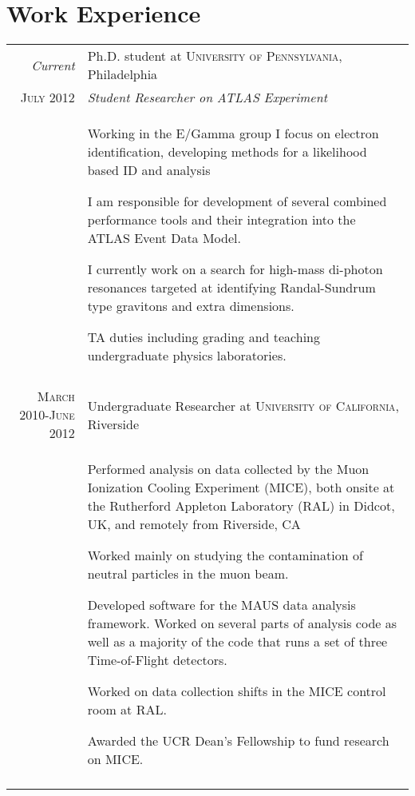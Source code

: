 \documentclass[a4paper,10pt]{article} %
\begin{document}

\section{Work Experience}

\begin{tabular}{r|p{11cm}}
\emph{Current}    & Ph.D. student at \textsc{University of Pennsylvania}, Philadelphia \\
\textsc{July 2012} & \emph{Student Researcher on ATLAS Experiment}\\
				   & \begin{itemize}
					 \footnotesize{
						\item Working in the E/Gamma group I focus on electron identification, developing methods for a likelihood based ID and analysis
						\item I am responsible for development of several combined performance tools and their integration into the ATLAS Event Data Model.
						\item I currently work on a search for high-mass di-photon resonances targeted at identifying Randal-Sundrum type gravitons and extra dimensions.
						\item TA duties including grading and teaching undergraduate physics laboratories.
					 }
					 \end{itemize} \\
\multicolumn{2}{c}{} \\


\textsc{March 2010-June 2012} & Undergraduate Researcher at \textsc{University of California}, Riverside \emph{}\\
				  & \begin{itemize}
					\footnotesize{
						\item Performed analysis on data collected by the Muon Ionization Cooling Experiment (MICE), both onsite at the Rutherford Appleton Laboratory (RAL) in Didcot, UK, and remotely from Riverside, CA
						\item Worked mainly on studying the contamination of neutral particles in the muon beam.
					    \item Developed software for the MAUS data analysis framework.  Worked on several parts of analysis code as well as a majority of the code that runs a set of three Time-of-Flight detectors.
						\item Worked on data collection shifts in the MICE control room at RAL.
						\item Awarded the UCR Dean’s Fellowship to fund research on MICE.
					}
			        \end{itemize} \\
\multicolumn{2}{c}{} \\


\end{tabular}
\end{document}

